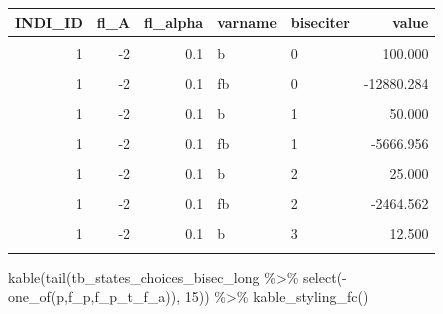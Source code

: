 \documentclass[
]{book}
\newenvironment{Shaded}{\begin{snugshade}}{\end{snugshade}}
\newcommand{\DecValTok}[1]{\textcolor[rgb]{0.00,0.00,0.81}{#1}}
\newcommand{\FunctionTok}[1]{\textcolor[rgb]{0.00,0.00,0.00}{#1}}
\newcommand{\NormalTok}[1]{#1}
\newcommand{\SpecialCharTok}[1]{\textcolor[rgb]{0.00,0.00,0.00}{#1}}
\newcommand{\StringTok}[1]{\textcolor[rgb]{0.31,0.60,0.02}{#1}}
\begin{document}
\begin{table}[!h]
\centering
\begin{tabular}{r|r|r|l|l|r}
\hline
INDI\_ID & fl\_A & fl\_alpha & varname & biseciter & value\\
\hline
\cellcolor{gray!6}{1} & \cellcolor{gray!6}{-2} & \cellcolor{gray!6}{0.1} & \cellcolor{gray!6}{a} & \cellcolor{gray!6}{0} & \cellcolor{gray!6}{0.000}\\
\hline
1 & -2 & 0.1 & b & 0 & 100.000\\
\hline
\cellcolor{gray!6}{1} & \cellcolor{gray!6}{-2} & \cellcolor{gray!6}{0.1} & \cellcolor{gray!6}{fa} & \cellcolor{gray!6}{0} & \cellcolor{gray!6}{100.000}\\
\hline
1 & -2 & 0.1 & fb & 0 & -12880.284\\
\hline
\cellcolor{gray!6}{1} & \cellcolor{gray!6}{-2} & \cellcolor{gray!6}{0.1} & \cellcolor{gray!6}{a} & \cellcolor{gray!6}{1} & \cellcolor{gray!6}{0.000}\\
\hline
1 & -2 & 0.1 & b & 1 & 50.000\\
\hline
\cellcolor{gray!6}{1} & \cellcolor{gray!6}{-2} & \cellcolor{gray!6}{0.1} & \cellcolor{gray!6}{fa} & \cellcolor{gray!6}{1} & \cellcolor{gray!6}{100.000}\\
\hline
1 & -2 & 0.1 & fb & 1 & -5666.956\\
\hline
\cellcolor{gray!6}{1} & \cellcolor{gray!6}{-2} & \cellcolor{gray!6}{0.1} & \cellcolor{gray!6}{a} & \cellcolor{gray!6}{2} & \cellcolor{gray!6}{0.000}\\
\hline
1 & -2 & 0.1 & b & 2 & 25.000\\
\hline
\cellcolor{gray!6}{1} & \cellcolor{gray!6}{-2} & \cellcolor{gray!6}{0.1} & \cellcolor{gray!6}{fa} & \cellcolor{gray!6}{2} & \cellcolor{gray!6}{100.000}\\
\hline
1 & -2 & 0.1 & fb & 2 & -2464.562\\
\hline
\cellcolor{gray!6}{1} & \cellcolor{gray!6}{-2} & \cellcolor{gray!6}{0.1} & \cellcolor{gray!6}{a} & \cellcolor{gray!6}{3} & \cellcolor{gray!6}{0.000}\\
\hline
1 & -2 & 0.1 & b & 3 & 12.500\\
\hline
\cellcolor{gray!6}{1} & \cellcolor{gray!6}{-2} & \cellcolor{gray!6}{0.1} & \cellcolor{gray!6}{fa} & \cellcolor{gray!6}{3} & \cellcolor{gray!6}{100.000}\\
\hline
\end{tabular}
\end{table}

\begin{Shaded}
\begin{Highlighting}[]
\FunctionTok{kable}\NormalTok{(}\FunctionTok{tail}\NormalTok{(tb\_states\_choices\_bisec\_long }\SpecialCharTok{\%\textgreater{}\%} 
             \FunctionTok{select}\NormalTok{(}\SpecialCharTok{{-}}\FunctionTok{one\_of}\NormalTok{(}\StringTok{\textquotesingle{}p\textquotesingle{}}\NormalTok{,}\StringTok{\textquotesingle{}f\_p\textquotesingle{}}\NormalTok{,}\StringTok{\textquotesingle{}f\_p\_t\_f\_a\textquotesingle{}}\NormalTok{)), }\DecValTok{15}\NormalTok{)) }\SpecialCharTok{\%\textgreater{}\%} 
  \FunctionTok{kable\_styling\_fc}\NormalTok{()}
\end{Highlighting}
\end{Shaded}
\end{document}
